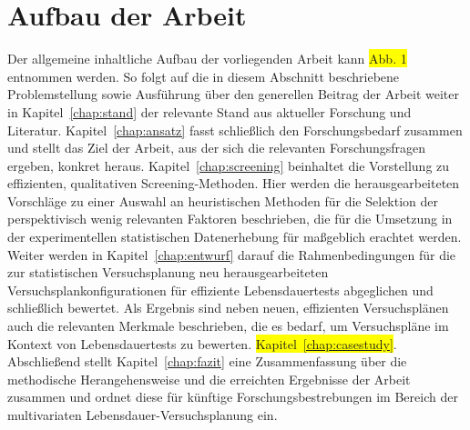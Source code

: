 \section{Aufbau der Arbeit} \label{sec:aufbau}
Der allgemeine inhaltliche Aufbau der vorliegenden Arbeit kann \colorbox{yellow}{Abb. 1} entnommen werden.
So folgt auf die in diesem Abschnitt beschriebene Problemstellung sowie Ausführung über den generellen Beitrag der Arbeit weiter in Kapitel~\ref{chap:stand} der relevante Stand aus aktueller Forschung und Literatur.
Kapitel~\ref{chap:ansatz} fasst schließlich den Forschungsbedarf zusammen und stellt das Ziel der Arbeit, aus der sich die relevanten Forschungsfragen ergeben, konkret heraus.
Kapitel~\ref{chap:screening} beinhaltet die Vorstellung zu effizienten, qualitativen Screening-Methoden.
Hier werden die herausgearbeiteten Vorschläge zu einer Auswahl an heuristischen Methoden für die Selektion der perspektivisch wenig relevanten Faktoren beschrieben, die für die Umsetzung in der experimentellen statistischen Datenerhebung für maßgeblich erachtet werden.
Weiter werden in Kapitel~\ref{chap:entwurf} darauf die Rahmenbedingungen für die zur statistischen Versuchsplanung neu herausgearbeiteten Versuchsplankonfigurationen für effiziente Lebensdauertests abgeglichen und schließlich bewertet.
Als Ergebnis sind neben neuen, effizienten Versuchsplänen auch die relevanten Merkmale beschrieben, die es bedarf, um Versuchspläne im Kontext von Lebensdauertests zu bewerten.
\colorbox{yellow}{Kapitel~\ref{chap:casestudy}}.
Abschließend stellt Kapitel~\ref{chap:fazit} eine Zusammenfassung über die methodische Herangehensweise und die erreichten Ergebnisse der Arbeit zusammen und ordnet diese für künftige Forschungsbestrebungen im Bereich der multivariaten Lebensdauer-Versuchsplanung ein.

